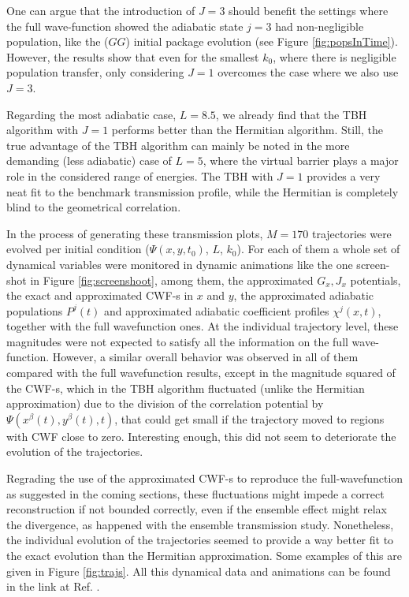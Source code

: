 \documentclass[11pt, a4paper]{article} %
\begin{document}
One can argue that the introduction of $J=3$ should benefit the settings where the full wave-function showed the adiabatic state $j=3$ had non-negligible population, like the ($GG$) initial package evolution (see Figure \ref{fig:popsInTime}). However, the results show that even for the smallest $k_0$, where there is negligible population transfer, only considering $J=1$ overcomes the case where we also use $J=3$.

Regarding the most adiabatic case, $L=8.5$, we already find that the TBH algorithm with $J=1$ performs better than the Hermitian algorithm. Still, the true advantage of the TBH algorithm can mainly be noted in the more demanding (less adiabatic) case of $L=5$, where the virtual barrier plays a major role in the considered range of energies. The TBH with $J=1$ provides a very neat fit to the benchmark transmission profile, while the Hermitian is completely blind to the geometrical correlation.

In the process of generating these transmission plots, $M=170$ trajectories were evolved per initial condition ($\Psi(x,y,t_0)$, $L$, $k_0$). For each of them a whole set of dynamical variables  were monitored in dynamic animations like the one screen-shot in Figure \ref{fig:screenshoot}, among them, the approximated $G_x,J_x$ potentials, the exact and approximated CWF-s in $x$ and $y$, the approximated adiabatic populations $P^j(t)$ and approximated adiabatic coefficient profiles $\chi^j(x,t)$, together with the full wavefunction ones. At the individual trajectory level, these magnitudes were not expected to satisfy all the information on the full wave-function. However, a similar overall behavior was observed in all of them compared with the full wavefunction results, except in the magnitude squared of the CWF-s, which in the TBH algorithm fluctuated (unlike the Hermitian approximation) due to the division of the correlation potential by $\Psi(x^\beta(t), y^\beta(t),t)$, that could get small if the trajectory moved to regions with CWF close to zero. Interesting enough, this did not seem to deteriorate the evolution of the trajectories. 

Regrading the use of the approximated CWF-s to reproduce the full-wavefunction as suggested in the coming sections, these fluctuations might impede a correct reconstruction if not bounded correctly, even if the ensemble effect might relax the divergence, as happened with the ensemble transmission study. Nonetheless, the individual evolution of the trajectories seemed to provide a way better fit to the exact evolution than the Hermitian approximation. Some examples of this are given in Figure \ref{fig:trajs}. All this dynamical data and animations can be found in the link at Ref. \cite{DATA}.
\end{document}
